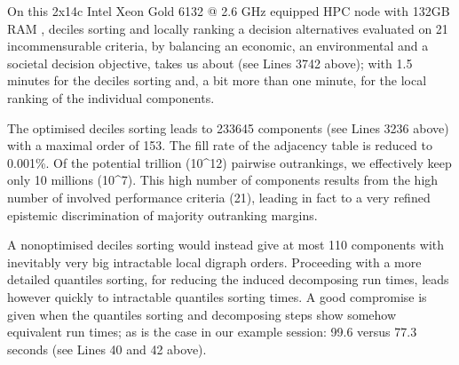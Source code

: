 \documentclass[a4paper,12pt,english]{sphinxhowto}
\begin{document}
\begin{sphinxVerbatim}[commandchars=\\\{\},numbers=left,firstnumber=1,stepnumber=1]
\end{sphinxVerbatim}

On this 2x14c Intel Xeon Gold 6132 @ 2.6 GHz equipped HPC node with 132GB RAM \sphinxfootnotemark[7], deciles sorting and locally ranking a  decision alternatives evaluated on 21 incommensurable criteria, by balancing an economic, an environmental and a societal decision objective, takes us about  (see Lines 37\sphinxhyphen{}42 above); with 1.5 minutes for the deciles sorting and, a bit more than one minute, for the local ranking of the individual components.

The optimised deciles sorting leads to 233645 components (see Lines 32\sphinxhyphen{}36 above) with a maximal order of 153. The fill rate of the adjacency table is reduced to 0.001\%. Of the potential trillion (10\textasciicircum{}12) pairwise outrankings, we effectively keep only 10 millions (10\textasciicircum{}7). This high number of components results from the high number of involved performance criteria (21), leading in fact to a very refined epistemic discrimination of majority outranking margins.

A non\sphinxhyphen{}optimised deciles sorting would instead give at most 110 components with inevitably very big intractable local digraph orders. Proceeding with a more detailed quantiles sorting, for reducing the induced decomposing run times, leads however quickly to intractable quantiles sorting times. A good compromise is given when the quantiles sorting and decomposing steps show somehow equivalent run times; as is the case in our example session: 99.6 versus 77.3 seconds (see Lines 40 and 42 above).
\end{document}
